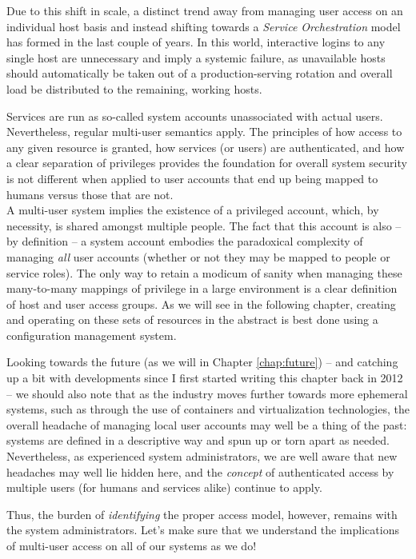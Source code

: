 Due to this shift in scale, a distinct trend away from
managing user access on an individual host basis and
instead shifting towards a {\em Service
Orchestration} model has
formed in the last couple of years.  In this world,
interactive logins to any single host are unnecessary
and imply a systemic failure, as unavailable hosts
should automatically be taken out of a
production-serving rotation and overall load be
distributed to the remaining, working hosts.

Services are run as so-called system accounts
unassociated with actual users.  Nevertheless, regular
multi-user semantics apply.  The principles of how
access to any given resource is granted, how services
(or users) are authenticated, and how a clear
separation of privileges provides the foundation for
overall system security is not different when applied
to user accounts that end up being mapped to humans
versus those that are not.  \\

A multi-user system implies the existence of a
privileged account, which, by necessity, is shared
amongst multiple people.  The fact that this account
is also -- by definition -- a system account embodies
the paradoxical complexity of managing {\em all} user
accounts (whether or not they may be mapped to people
or service roles).  The only way to retain a modicum
of sanity when managing these many-to-many mappings of
privilege in a large environment is a clear definition
of host and user access groups.  As we will see in the
following chapter, creating and operating on these
sets of resources in the abstract is best done using a
configuration management system.

Looking towards the future (as we will in Chapter
\ref{chap:future}) -- and catching up a bit with
developments since I first started writing this
chapter back in 2012 -- we should also note that as
the industry moves further towards more ephemeral
systems, such as through the use of containers and
virtualization technologies, the overall headache of
managing local user accounts may well be a thing of
the past: systems are defined in a descriptive way and
spun up or torn apart as needed.  Nevertheless, as
experienced system administrators, we are well aware
that new headaches may well lie hidden here, and the
{\em concept} of authenticated access by multiple
users (for humans and services alike) continue to
apply.

Thus, the burden of {\em identifying} the proper
access model, however, remains with the system
administrators.  Let's make sure that we understand
the implications of multi-user access on all of our
systems as we do!

